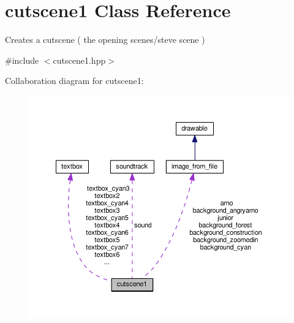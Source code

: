 \hypertarget{classcutscene1}{}\section{cutscene1 Class Reference}
\label{classcutscene1}


Creates a cutscene ( the opening scenes/steve scene )  




{\ttfamily \#include $<$cutscene1.\+hpp$>$}



Collaboration diagram for cutscene1\+:
\nopagebreak
\begin{figure}[H]
\begin{center}
\leavevmode
\includegraphics[width=350pt]{classcutscene1__coll__graph}
\end{center}
\end{figure}
